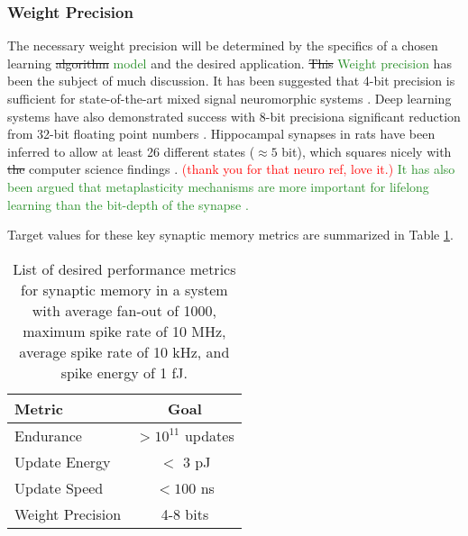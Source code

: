 \documentclass[twocolumn]{article}
\begin{document}
\subsubsection{Weight Precision}
The necessary weight precision will be determined by the specifics of a chosen learning \sout{algorithm} \textcolor{ForestGreen}{model} and the desired application. \sout{This} \textcolor{ForestGreen}{Weight precision} has been the subject of much discussion. It has been suggested that 4-bit precision is sufficient for state-of-the-art mixed signal neuromorphic systems \cite{pfeil20124}. Deep learning systems have also demonstrated success with 8-bit precision\textemdash a significant reduction from 32-bit floating point numbers \cite{wang2018training}. Hippocampal synapses in rats have been inferred to allow at least 26 different states ($\approx 5$ bit), which squares nicely with \sout{the} computer science findings \cite{bartol2015nanoconnectomic}. \textcolor{red}{(thank you for that neuro ref, love it.)} \textcolor{ForestGreen}{It has also been argued that metaplasticity mechanisms are more important for lifelong learning than the bit-depth of the synapse \cite{fudr2005,fuab2007}.}

Target values for these key synaptic memory metrics are summarized in Table \ref{tab:memory_metrics}.

\begin{table}[h!]
  \begin{center}
    \label{tab:memory_metrics}
    \renewcommand{\arraystretch}{1.5}
    \begin{tabular}{l|c} %
      \textbf{Metric} & \textbf{Goal} \\
      \hline
      Endurance & $>10^{11}$ updates \\
      Update Energy & $<$ 3 pJ\\
      Update Speed & $<100$ ns \\
      Weight Precision & 4-8 bits
      
    \end{tabular}
    \caption{List of desired performance metrics for synaptic memory in a system with average fan-out of 1000, maximum spike rate of 10 MHz, average spike rate of 10 kHz, and spike energy of 1 fJ.}
  \end{center}
\end{table}
\end{document}
